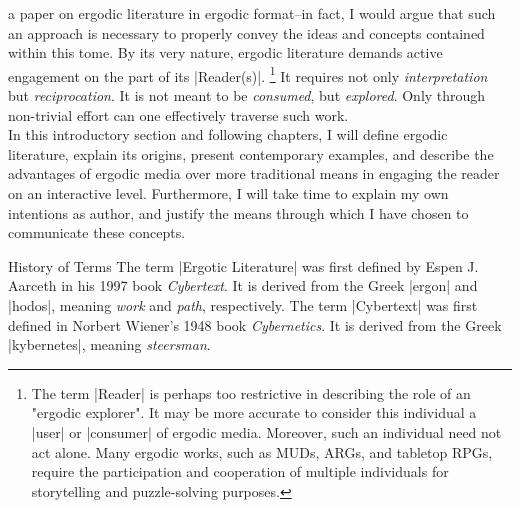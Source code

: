 \documentclass[10pt,twoside,twocolumn,openany,nomultitoc]{book}
\begin{document}
 a paper on ergodic literature in ergodic format--in fact, I would argue that such an approach is necessary to properly convey the ideas and concepts contained within this tome. By its very nature, ergodic literature demands active engagement on the part of its 
|Reader(s)|.
    \footnote{The term |Reader| is perhaps too restrictive in describing the role of an "ergodic explorer". It may be more accurate to consider this individual a |user| or |consumer| of ergodic media. Moreover, such  an individual need not act alone. Many ergodic works, such as MUDs, ARGs, and tabletop RPGs, require the participation and cooperation of multiple individuals for storytelling and puzzle-solving purposes.}         
It requires not only \textit{interpretation} but \textit{reciprocation}. It is not meant to be \textit{consumed}, but \textit{explored}. Only through non-trivial effort can one effectively traverse such work. \\ 

    In this introductory section and following chapters, I will define ergodic literature, explain its origins, present contemporary examples, and describe the advantages of ergodic media over more traditional means in engaging the reader on an interactive level. Furthermore, I will take time to explain my own intentions as author, and justify the means through which I have chosen to communicate these concepts.

\begin{DndSidebar}[]{History of Terms}
  The term |Ergotic Literature| was first defined by Espen J. Aarceth in his 1997 book \textit{Cybertext}. It is derived from the Greek |ergon| and |hodos|, meaning \textit{work} and \textit{path}, respectively. The term |Cybertext| was first defined in Norbert Wiener's 1948 book \textit{Cybernetics}. It is derived from the Greek |kybernetes|, meaning \textit{steersman}.
\end{DndSidebar}
    
\end{document}
